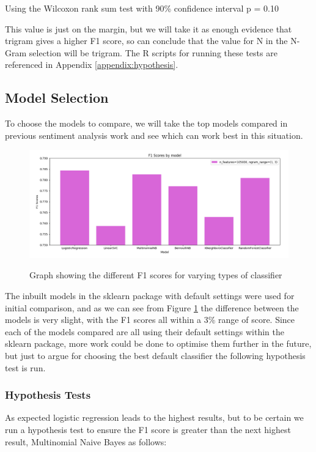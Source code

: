 Using the Wilcoxon rank sum test with 90\% confidence interval 
p = 0.10

This value is just on the margin, but we will take it as enough evidence that trigram gives a higher F1 score, so can conclude that the value for N in the N-Gram selection will be trigram. The R scripts for running these tests are referenced in Appendix \ref{appendix:hypothesis}.


\subsection{Model Selection}

To choose the models to compare, we will take the top models compared in previous sentiment analysis work \cite{towardsDS} and see which can work best in this situation.

\begin{figure}[h]
\caption{Graph showing the different F1 scores for varying types of classifier}
\centering
\includegraphics[scale=0.5]{graphs/models.png}
\label{model:graph}
\end{figure}

The inbuilt models in the sklearn package with default settings were used for initial comparison, and as we can see from Figure \ref{model:graph} the difference between the models is very slight, with the F1 scores all within a 3\% range of score. Since each of the models compared are all using their default settings within the sklearn package, more work could be done to optimise them further in the future, but just to argue for choosing the best default classifier the following hypothesis test is run.

\subsubsection{Hypothesis Tests}

As expected logistic regression leads to the highest results, but to be certain we run a hypothesis test to ensure the F1 score is greater than the next highest result, Multinomial Naive Bayes as follows:

